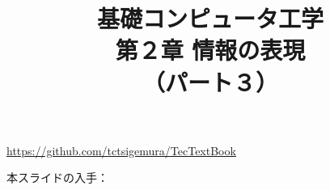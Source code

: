 \documentclass[handout]{beamer}        %
\begin{document}
\title{基礎コンピュータ工学\\第２章 情報の表現\\（パート３）}
\date{}

\begin{frame}
  \titlepage
  \centerline{\url{https://github.com/tctsigemura/TecTextBook}}
  \vfill
  \centerline{本スライドの入手：
    }
\end{frame}

\end{document}
